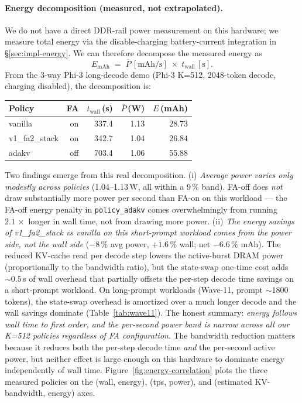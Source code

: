 \documentclass[sigconf, anonymous=false, screen=true]{acmart}
\begin{document}
\paragraph{Energy decomposition (measured, not extrapolated).} We do not have a direct DDR-rail power measurement on this hardware; we measure total energy via the disable-charging battery-current integration in \S\ref{sec:impl-energy}. We can therefore decompose the measured energy as
\[
E_{\text{mAh}} \;=\; \overline{P}\,[\text{mAh/s}] \;\times\; t_{\text{wall}}\,[\text{s}].
\]
From the 3-way Phi-3 long-decode demo (Phi-3 K=512, 2048-token decode, charging disabled), the decomposition is:
\begin{center}
\small
\begin{tabular}{lrrrr}
\toprule
Policy & FA & $t_{\text{wall}}$\,(s) & $\overline{P}$\,(W) & $E$\,(mAh) \\
\midrule
vanilla       & on  & 337.4 & 1.13 & 28.73 \\
v1\_fa2\_stack & on  & 342.7 & 1.04 & 26.84 \\
adakv          & off & 703.4 & 1.06 & 55.88 \\
\bottomrule
\end{tabular}
\end{center}
Two findings emerge from this real decomposition. (i) \emph{Average power varies only modestly across policies} (1.04--1.13\,W, all within a 9\,\% band). FA-off does \emph{not} draw substantially more power per second than FA-on on this workload --- the FA-off energy penalty in \texttt{policy\_adakv} comes overwhelmingly from running $2.1\,\times$ longer in wall time, not from drawing more power. (ii) \emph{The energy savings of v1\_fa2\_stack vs vanilla on this short-prompt workload comes from the power side, not the wall side} ($-8\,\%$ avg power, $+1.6\,\%$ wall; net $-6.6\,\%$ mAh). The reduced KV-cache read per decode step lowers the active-burst DRAM power (proportionally to the bandwidth ratio), but the state-swap one-time cost adds $\sim 0.5$\,s of wall overhead that partially offsets the per-step decode time savings on a short-prompt workload. On long-prompt workloads (Wave-11, prompt $\sim$1800 tokens), the state-swap overhead is amortized over a much longer decode and the wall savings dominate (Table~\ref{tab:wave11}). The honest summary: \emph{energy follows wall time to first order, and the per-second power band is narrow across all our K=512 policies regardless of FA configuration}. The bandwidth reduction matters because it reduces both the per-step decode time \emph{and} the per-second active power, but neither effect is large enough on this hardware to dominate energy independently of wall time. Figure~\ref{fig:energy-correlation} plots the three measured policies on the (wall, energy), (tps, power), and (estimated KV-bandwidth, energy) axes.
\end{document}
